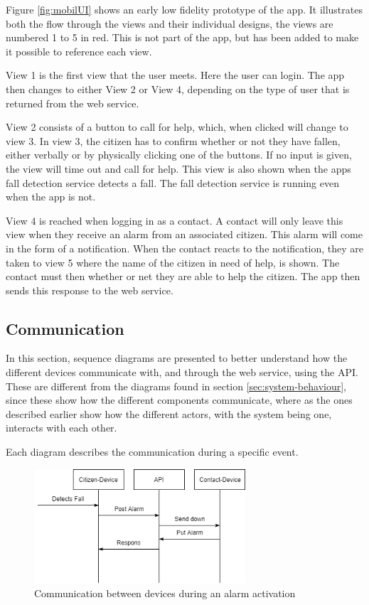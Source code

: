 Figure \ref{fig:mobilUI} shows an early low fidelity prototype of the app. It illustrates both the flow through the views and their individual designs, the views are numbered 1 to 5 in red. This is not part of the app, but has been added to make it possible to reference each view.

View 1 is the first view that the user meets. Here the user can login. The app then changes to either View 2 or View 4, depending on the type of user that is returned from the web service.

View 2 consists of a button to call for help, which, when clicked will change to view 3. In view 3, the citizen has to confirm whether or not they have fallen, either verbally or by physically clicking one of the buttons. If no input is given, the view will time out and call for help. This view is also shown when the apps fall detection service detects a fall. The fall detection service is running even when the app is not.

View 4 is reached when logging in as a contact. A contact will only leave this view when they receive an alarm from an associated citizen. This alarm will come in the form of a notification. When the contact reacts to the notification, they are taken to view 5 where the name of the citizen in need of help, is shown. The contact must then whether or net they are able to help the citizen. The app then sends this response to the web service.

\subsection{Communication}
In this section, sequence diagrams are presented to better understand how the different devices communicate with, and through the web service, using the API. These are different from the diagrams found in section \ref{sec:system-behaviour}, since these show how the different components communicate, where as the ones described earlier show how the different actors, with the system being one, interacts with each other. 

Each diagram describes the communication during a specific event.

\begin{figure}[H]
    \centering
    \includegraphics[width=0.7\textwidth]{Figures/Citizen_to_Contact.png}
    \caption{Communication between devices during an alarm activation}
    \label{fig:post-alarm}
\end{figure}


